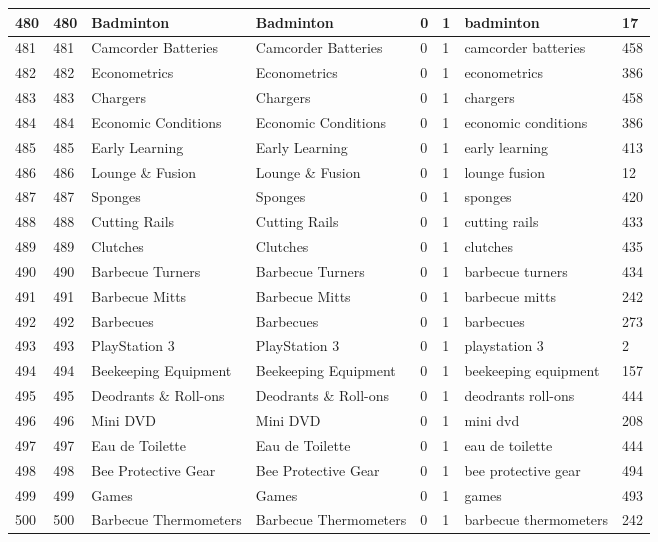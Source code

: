 \begin{longtable}{|l|l|l|l|l|l|l|l|}
480 & 480 & Badminton & Badminton & 0 & 1 & badminton & 17 \\ \hline 
481 & 481 & Camcorder Batteries & Camcorder Batteries & 0 & 1 & camcorder batteries & 458 \\ \hline 
482 & 482 & Econometrics & Econometrics & 0 & 1 & econometrics & 386 \\ \hline 
483 & 483 & Chargers & Chargers & 0 & 1 & chargers & 458 \\ \hline 
484 & 484 & Economic Conditions & Economic Conditions & 0 & 1 & economic conditions & 386 \\ \hline 
485 & 485 & Early Learning & Early Learning & 0 & 1 & early learning & 413 \\ \hline 
486 & 486 & Lounge \& Fusion & Lounge \& Fusion & 0 & 1 & lounge fusion & 12 \\ \hline 
487 & 487 & Sponges & Sponges & 0 & 1 & sponges & 420 \\ \hline 
488 & 488 & Cutting Rails & Cutting Rails & 0 & 1 & cutting rails & 433 \\ \hline 
489 & 489 & Clutches & Clutches & 0 & 1 & clutches & 435 \\ \hline 
490 & 490 & Barbecue Turners & Barbecue Turners & 0 & 1 & barbecue turners & 434 \\ \hline 
491 & 491 & Barbecue Mitts & Barbecue Mitts & 0 & 1 & barbecue mitts & 242 \\ \hline 
492 & 492 & Barbecues & Barbecues & 0 & 1 & barbecues & 273 \\ \hline 
493 & 493 & PlayStation 3 & PlayStation 3 & 0 & 1 & playstation 3 & 2 \\ \hline 
494 & 494 & Beekeeping Equipment & Beekeeping Equipment & 0 & 1 & beekeeping equipment & 157 \\ \hline 
495 & 495 & Deodrants \& Roll-ons & Deodrants \& Roll-ons & 0 & 1 & deodrants roll-ons & 444 \\ \hline 
496 & 496 & Mini DVD & Mini DVD & 0 & 1 & mini dvd & 208 \\ \hline 
497 & 497 & Eau de Toilette & Eau de Toilette & 0 & 1 & eau de toilette & 444 \\ \hline 
498 & 498 & Bee Protective Gear & Bee Protective Gear & 0 & 1 & bee protective gear & 494 \\ \hline 
499 & 499 & Games & Games & 0 & 1 & games & 493 \\ \hline 
500 & 500 & Barbecue Thermometers & Barbecue Thermometers & 0 & 1 & barbecue thermometers & 242 \\ \hline 

\end{longtable}
